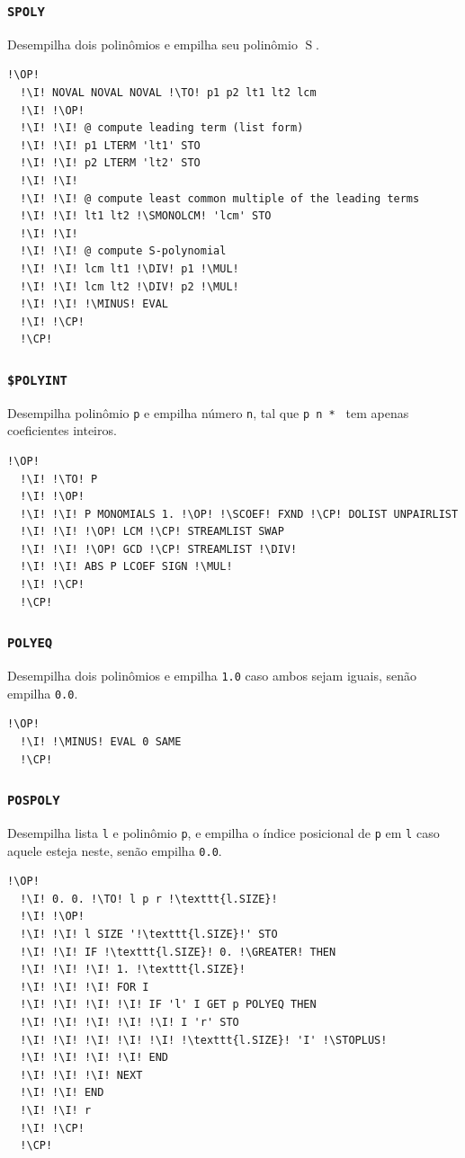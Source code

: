 \documentclass[12pt,a4paper]{report}
\newcommand{\kwd}[1]{\texttt{\textcolor{keyword}{#1}}}
\newcommand{\I}{\enspace\textcolor{indent}\vrule\hspace{2pt}}
\newcommand{\GREATER}{\kwd{$>$}}   %
\newcommand{\MINUS}{\kwd{-}}   %
\newcommand{\MUL}{\kwd{*}}   %
\newcommand{\DIV}{\kwd{/}}   %
\newcommand{\STOPLUS}{\kwd{STO+}} %
\newcommand{\SCOEF}{\kwd{\$COEF}}   %
\newcommand{\SMONOLCM}{\kwd{\$MONOLCM}}   %
\newcommand{\SPOLY}{\kwd{SPOLY}}   %
\newcommand{\SPOLYINT}{\kwd{\$POLYINT}}   %
\newcommand{\POLYEQ}{\kwd{POLYEQ}}   %
\newcommand{\POSPOLY}{\kwd{POSPOLY}}   %
\newcommand{\OP}{\kwd{$\ll$}}   %
\newcommand{\CP}{\kwd{$\gg$}}   %
\newcommand{\TO}{\kwd{$\rightarrow$}} %
\numberwithin{theorem}{chapter}
\DeclareMathOperator{\Sp}{S}
\begin{document}
\subsubsection{\SPOLY}\label{SPOLY}
Desempilha dois polinômios e empilha seu polinômio \(\Sp\).
\begin{lstlisting}[language=userrpl]
  !\OP!
  !\I! NOVAL NOVAL NOVAL !\TO! p1 p2 lt1 lt2 lcm
  !\I! !\OP!
  !\I! !\I! @ compute leading term (list form)
  !\I! !\I! p1 LTERM 'lt1' STO
  !\I! !\I! p2 LTERM 'lt2' STO
  !\I! !\I!
  !\I! !\I! @ compute least common multiple of the leading terms
  !\I! !\I! lt1 lt2 !\SMONOLCM! 'lcm' STO
  !\I! !\I!
  !\I! !\I! @ compute S-polynomial
  !\I! !\I! lcm lt1 !\DIV! p1 !\MUL!
  !\I! !\I! lcm lt2 !\DIV! p2 !\MUL!
  !\I! !\I! !\MINUS! EVAL
  !\I! !\CP!
  !\CP!
\end{lstlisting}

\subsubsection{\SPOLYINT}\label{SPOLYINT}
Desempilha polinômio \texttt{p} e empilha número \texttt{n}, tal que
\texttt{p n \MUL\ } tem apenas coeficientes inteiros.
\begin{lstlisting}[language=userrpl]
  !\OP!
  !\I! !\TO! P
  !\I! !\OP!
  !\I! !\I! P MONOMIALS 1. !\OP! !\SCOEF! FXND !\CP! DOLIST UNPAIRLIST
  !\I! !\I! !\OP! LCM !\CP! STREAMLIST SWAP
  !\I! !\I! !\OP! GCD !\CP! STREAMLIST !\DIV!
  !\I! !\I! ABS P LCOEF SIGN !\MUL!
  !\I! !\CP!
  !\CP!
\end{lstlisting}

\subsubsection{\POLYEQ}\label{POLYEQ}
Desempilha dois polinômios e empilha \texttt{1.0} caso ambos sejam
iguais, senão empilha \texttt{0.0}.
\begin{lstlisting}[language=userrpl]
  !\OP!
  !\I! !\MINUS! EVAL 0 SAME
  !\CP!
\end{lstlisting}

\subsubsection{\POSPOLY}\label{POSPOLY}
Desempilha lista \texttt{l} e polinômio \texttt{p}, e empilha o índice
posicional de \texttt{p} em \texttt{l} caso aquele esteja neste, senão
empilha \texttt{0.0}.
\begin{lstlisting}[language=userrpl]
  !\OP!
  !\I! 0. 0. !\TO! l p r !\texttt{l.SIZE}!
  !\I! !\OP!
  !\I! !\I! l SIZE '!\texttt{l.SIZE}!' STO
  !\I! !\I! IF !\texttt{l.SIZE}! 0. !\GREATER! THEN
  !\I! !\I! !\I! 1. !\texttt{l.SIZE}!
  !\I! !\I! !\I! FOR I
  !\I! !\I! !\I! !\I! IF 'l' I GET p POLYEQ THEN
  !\I! !\I! !\I! !\I! !\I! I 'r' STO
  !\I! !\I! !\I! !\I! !\I! !\texttt{l.SIZE}! 'I' !\STOPLUS!
  !\I! !\I! !\I! !\I! END
  !\I! !\I! !\I! NEXT
  !\I! !\I! END
  !\I! !\I! r
  !\I! !\CP!
  !\CP!
\end{lstlisting}
\end{document}
